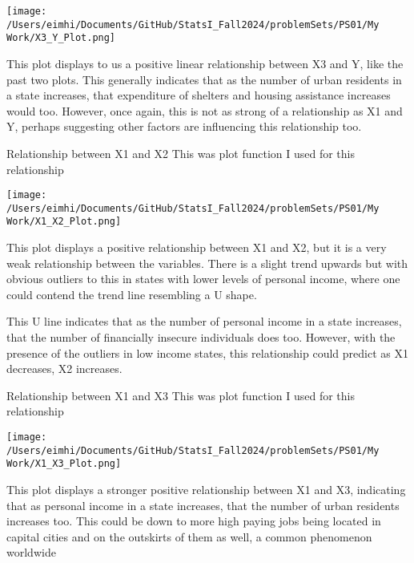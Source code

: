 \documentclass[12pt,letterpaper]{article}
\begin{document}
\begin{itemize}
    \texttt{[image: /Users/eimhi/Documents/GitHub/StatsI\_Fall2024/problemSets/PS01/My Work/X3\_Y\_Plot.png]}
    
    This plot displays to us a positive linear relationship between X3 and Y, like the past two plots. This generally indicates that as the number of urban residents in a state increases, that expenditure of shelters and housing assistance increases would too. However, once again, this is not as strong of a relationship as X1 and Y, perhaps suggesting other factors are influencing this relationship too.
    
    \newpage
    
    Relationship between X1 and X2
    This was plot function I used for this relationship
    
    
    \texttt{[image: /Users/eimhi/Documents/GitHub/StatsI\_Fall2024/problemSets/PS01/My Work/X1\_X2\_Plot.png]}
    
    This plot displays a positive relationship between X1 and X2, but it is a very weak relationship between the variables. There is a slight trend upwards but with obvious outliers to this in states with lower levels of personal income, where one could contend the trend line resembling a U shape.
    
    This U line indicates that as the number of personal income in a state increases, that the number of financially insecure individuals does too. However, with the presence of the outliers in low income states, this relationship could predict as X1 decreases, X2 increases.
    
    \newpage
    
    Relationship between X1 and X3
    This was plot function I used for this relationship
    
    
    \texttt{[image: /Users/eimhi/Documents/GitHub/StatsI\_Fall2024/problemSets/PS01/My Work/X1\_X3\_Plot.png]}
    
    This plot displays a stronger positive relationship between X1 and X3, indicating that as personal income in a state increases, that the number of urban residents increases too. This could be down to more high paying jobs being located in capital cities and on the outskirts of them as well, a common phenomenon worldwide
    

\end{itemize}
\end{document}
